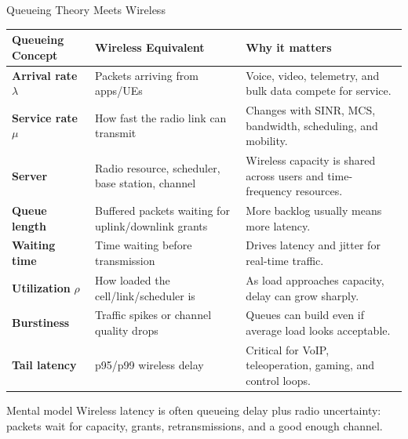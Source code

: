 \documentclass[aspectratio=169]{beamer}
\begin{document}
\begin{frame}{Queueing Theory Meets Wireless}
\tiny

\begin{tabular}{p{2.4cm} p{4.0cm} p{5.8cm}}
\toprule
\textbf{Queueing Concept} & \textbf{Wireless Equivalent} & \textbf{Why it matters} \\
\midrule
\textbf{Arrival rate} $\lambda$ & Packets arriving from apps/UEs & Voice, video, telemetry, and bulk data compete for service. \\
\textbf{Service rate} $\mu$ & How fast the radio link can transmit & Changes with SINR, MCS, bandwidth, scheduling, and mobility. \\
\textbf{Server} & Radio resource, scheduler, base station, channel & Wireless capacity is shared across users and time-frequency resources. \\
\textbf{Queue length} & Buffered packets waiting for uplink/downlink grants & More backlog usually means more latency. \\
\textbf{Waiting time} & Time waiting before transmission & Drives latency and jitter for real-time traffic. \\
\textbf{Utilization} $\rho$ & How loaded the cell/link/scheduler is & As load approaches capacity, delay can grow sharply. \\
\textbf{Burstiness} & Traffic spikes or channel quality drops & Queues can build even if average load looks acceptable. \\
\textbf{Tail latency} & p95/p99 wireless delay & Critical for VoIP, teleoperation, gaming, and control loops. \\
\bottomrule
\end{tabular}

\vspace{0.15cm}

\begin{alertblock}{Mental model}
Wireless latency is often queueing delay plus radio uncertainty: packets wait for capacity, grants, retransmissions, and a good enough channel.
\end{alertblock}

\end{frame}
\end{document}
